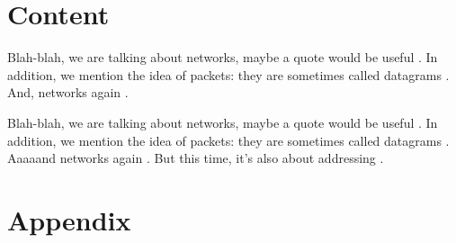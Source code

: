 \documentclass{article}
\begin{document}
    \section{Content}
    Blah-blah, we are talking about networks, maybe a quote would be useful . In addition, we mention the idea of packets: they are sometimes called datagrams . And, networks again .
    
    Blah-blah, we are talking about networks, maybe a quote would be useful . In addition, we mention the idea of packets: they are sometimes called datagrams . Aaaaand networks again . But this time, it's also about addressing . 
    
    \section{Appendix}
\end{document}
